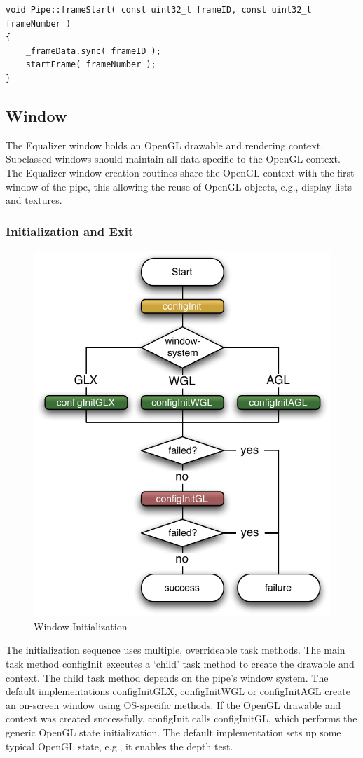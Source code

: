 \documentclass[10pt,a4]{scrartcl}
\begin{document}
{\footnotesize\begin{lstlisting}
void Pipe::frameStart( const uint32_t frameID, const uint32_t frameNumber )
{
    _frameData.sync( frameID );
    startFrame( frameNumber );
}
\end{lstlisting}}


\subsection{Window}

The Equalizer window holds an OpenGL drawable and rendering
context. Subclassed windows should maintain all data specific to the
OpenGL context. The Equalizer window creation routines share the OpenGL
context with the first window of the pipe, this allowing the reuse of
OpenGL objects, e.g., display lists and textures.

\subsubsection{Initialization and Exit}

\begin{figure}
  \includegraphics[width=.4\textwidth]{images/windowInit.pdf}
  {\caption{\small\label{fWindowInit}Window Initialization}}
\end{figure}

The initialization sequence uses multiple, overrideable task
methods. The main task method \textsf{configInit} executes a `child'
task method to create the drawable and context. The child task method
depends on the pipe's window system. The default implementations
\textsf{configInitGLX}, \textsf{configInitWGL} or \textsf{configInitAGL}
create an on-screen window using OS-specific methods. If the OpenGL
drawable and context was created successfully, \textsf{configInit} calls
\textsf{configInitGL}, which performs the generic OpenGL state
initialization. The default implementation sets up some typical OpenGL
state, e.g., it enables the depth test.
\end{document}
